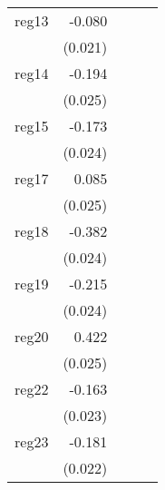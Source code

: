 {\begin{longtable}{l*{4}{D{.}{.}{-1}}}
\addlinespace
reg13       &      -0.080\sym{***}&                     &                     &                     \\
            &     (0.021)         &                     &                     &                     \\
\addlinespace
reg14       &      -0.194\sym{***}&                     &                     &                     \\
            &     (0.025)         &                     &                     &                     \\
\addlinespace
reg15       &      -0.173\sym{***}&                     &                     &                     \\
            &     (0.024)         &                     &                     &                     \\
\addlinespace
reg17       &       0.085\sym{***}&                     &                     &                     \\
            &     (0.025)         &                     &                     &                     \\
\addlinespace
reg18       &      -0.382\sym{***}&                     &                     &                     \\
            &     (0.024)         &                     &                     &                     \\
\addlinespace
reg19       &      -0.215\sym{***}&                     &                     &                     \\
            &     (0.024)         &                     &                     &                     \\
\addlinespace
reg20       &       0.422\sym{***}&                     &                     &                     \\
            &     (0.025)         &                     &                     &                     \\
\addlinespace
reg22       &      -0.163\sym{***}&                     &                     &                     \\
            &     (0.023)         &                     &                     &                     \\
\addlinespace
reg23       &      -0.181\sym{***}&                     &                     &                     \\
            &     (0.022)         &                     &                     &                     \\

\end{longtable}}
